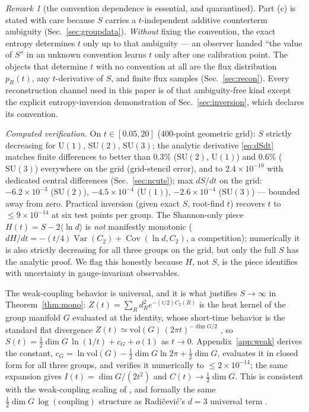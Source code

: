 \documentclass[11pt]{article}
\theoremstyle{remark}
\newtheorem{remark}[theorem]{Remark}
\theoremstyle{plain}
\newcommand{\Var}{\operatorname{Var}}
\newcommand{\Cov}{\operatorname{Cov}}
\newcommand{\dG}{\dim G}
\begin{document}
\begin{remark}[the convention dependence is essential, and quarantined]\label{rem:convention}
Part (c) is stated with care because $S$ carries a $t$-independent additive counterterm ambiguity (Sec.~\ref{sec:groupdata}). \emph{Without} fixing the convention, the exact entropy determines $t$ only up to that ambiguity --- an observer handed ``the value of $S$'' in an unknown convention learns $t$ only after one calibration point. The objects that determine $t$ with no convention at all are the flux distribution $p_R(t)$, any $t$-derivative of $S$, and finite flux samples (Sec.~\ref{sec:recon}). Every reconstruction channel used in this paper is of that ambiguity-free kind except the explicit entropy-inversion demonstration of Sec.~\ref{sec:inversion}, which declares its convention.
\end{remark}

\emph{Computed verification.} On $t \in [0.05, 20]$ (400-point geometric grid): $S$ strictly decreasing for $\mathrm{U}(1)$, $\mathrm{SU}(2)$, $\mathrm{SU}(3)$; the analytic derivative \eqref{eq:dSdt} matches finite differences to better than $0.3\%$ ($\mathrm{SU}(2)$, $\mathrm{U}(1)$) and $0.6\%$ ($\mathrm{SU}(3)$) everywhere on the grid (grid-stencil error), and to $2.4\times10^{-10}$ with dedicated central differences (Sec.~\ref{sec:ncuts}); max $dS/dt$ on the grid: $-6.2\times10^{-3}$ ($\mathrm{SU}(2)$), $-4.5\times10^{-4}$ ($\mathrm{U}(1)$), $-2.6\times10^{-4}$ ($\mathrm{SU}(3)$) --- bounded away from zero. Practical inversion (given exact $S$, root-find $t$) recovers $t$ to $\leq 9\times10^{-14}$ at six test points per group. The Shannon-only piece $H(t) = S - 2\langle\ln d\rangle$ is \emph{not} manifestly monotonic ($dH/dt = -(t/4)\Var(C_2) + \Cov(\ln d, C_2)$, a competition); numerically it is also strictly decreasing for all three groups on the grid, but only the full $S$ has the analytic proof. We flag this honestly because $H$, not $S$, is the piece \cite{D14} identifies with uncertainty in gauge-invariant observables.

The weak-coupling behavior is universal, and it is what justifies $S \to \infty$ in Theorem~\ref{thm:mono}: $Z(t) = \sum_R d_R^2 e^{-(t/2)C_2(R)}$ is the heat kernel of the group manifold $G$ evaluated at the identity, whose short-time behavior is the standard flat divergence $Z(t) \simeq \mathrm{vol}(G)\,(2\pi t)^{-\dG/2}$ \cite{Cam90, CMR94}, so $S(t) = \tfrac12\dG\,\ln(1/t) + c_G + o(1)$ as $t \to 0$. Appendix~\ref{app:weak} derives the constant, $c_G = \ln\mathrm{vol}(G) - \tfrac12\dG\ln 2\pi + \tfrac12\dG$, evaluates it in closed form for all three groups, and verifies it numerically to $\leq 2\times10^{-14}$; the same expansion gives $I(t) = \dG/(2t^2)$ and $C(t) \to \tfrac12\dG$. This is consistent with the weak-coupling scaling of \cite{GS14}, and formally the same $\tfrac12\dG\,\log(\text{coupling})$ structure as Radi\v{c}evi\'c's $d = 3$ universal term \cite{R15}.
\end{document}
